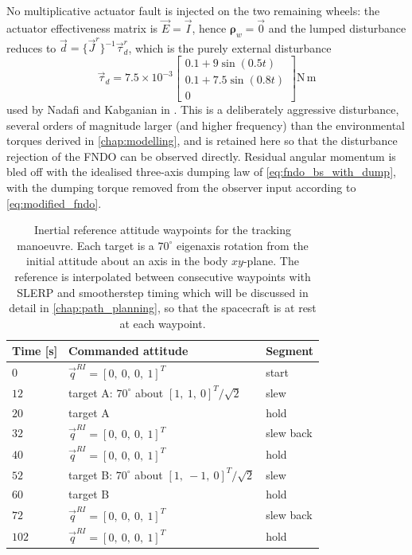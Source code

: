 No multiplicative actuator fault is injected on the two remaining wheels: the actuator effectiveness matrix is $\vec{E} = \vec{I}$, hence $\boldsymbol{\rho}_w = \vec{0}$ and the lumped disturbance reduces to $\vec{d} = \{\vec{J}^r\}^{-1}\vec{\tau}_d^r$, which is the purely external disturbance
\begin{equation}
    \vec{\tau}_d = 7.5\times10^{-3}
    \begin{bmatrix}
        0.1 + 9\sin(0.5t) \\
        0.1 + 7.5\sin(0.8t) \\
        0
    \end{bmatrix} \mathrm{N\,m}
    \label{eq:nadafi_disturbance}
\end{equation}
used by Nadafi and Kabganian in \cite{nadafiRobustBacksteppingAttitude2021}. This is a deliberately aggressive disturbance, several orders of magnitude larger (and higher frequency) than the environmental torques derived in \autoref{chap:modelling}, and is retained here so that the disturbance rejection of the FNDO can be observed directly. Residual angular momentum is bled off with the idealised three-axis dumping law of \autoref{eq:fndo_bs_with_dump}, with the dumping torque removed from the observer input according to \autoref{eq:modified_fndo}.
\begin{table}[ht]
\centering
\begin{tabular}{@{}l l l@{}}
\hline
Time [s] & Commanded attitude & Segment \\
\hline
$0$   & $\vec{q}^{RI} = [0,\ 0,\ 0,\ 1]^T$                 & start \\
$12$  & target A: $70^\circ$ about $[1,\ 1,\ 0]^T/\sqrt{2}$  & slew \\
$20$  & target A                                        & hold \\
$32$  & $\vec{q}^{RI} = [0,\ 0,\ 0,\ 1]^T$                 & slew back \\
$40$  & $\vec{q}^{RI} = [0,\ 0,\ 0,\ 1]^T$                 & hold \\
$52$  & target B: $70^\circ$ about $[1,\ -1,\ 0]^T/\sqrt{2}$ & slew \\
$60$  & target B                                        & hold \\
$72$  & $\vec{q}^{RI} = [0,\ 0,\ 0,\ 1]^T$                 & slew back \\
$102$ & $\vec{q}^{RI} = [0,\ 0,\ 0,\ 1]^T$                 & hold \\ %
\hline
\end{tabular}
\caption{Inertial reference attitude waypoints for the tracking manoeuvre. Each target is a $70^\circ$ eigenaxis rotation from the initial attitude about an axis in the body $xy$-plane. The reference is interpolated between consecutive waypoints with SLERP and smootherstep timing which will be discussed in detail in \autoref{chap:path_planning}, so that the spacecraft is at rest at each waypoint.}
\label{tab:nadafi_track_waypoints}
\end{table}

